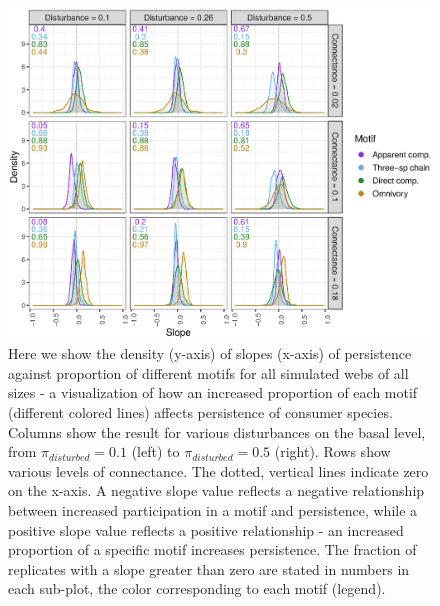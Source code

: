 \documentclass[12pt]{article}
\begin{document}
\begin{spacing}{2.0}
    \begin{figure}[hb!]
    \centering
        \includegraphics[width=\textwidth]{figures/prop_dens_bp_vs_C_allS.eps}
        \caption{Here we show the density (y-axis) of slopes (x-axis) of persistence against proportion of different motifs for all simulated webs of all sizes - a visualization of how an increased proportion of each motif (different colored lines) affects persistence of consumer species. Columns show the result for various disturbances on the basal level, from $\pi_{disturbed} = 0.1$ (left) to $\pi_{disturbed} = 0.5$ (right). Rows show various levels of connectance. The dotted, vertical lines indicate zero on the x-axis. A negative slope value reflects a negative relationship between increased participation in a motif and persistence, while a positive slope value reflects a positive relationship - an increased proportion of a specific motif increases persistence. The fraction of replicates with a slope greater than zero are stated in numbers in each sub-plot, the color corresponding to each motif (legend). }
        \label{fig:density_prop_C}
    \end{figure}    
    

\end{spacing}
\end{document}
